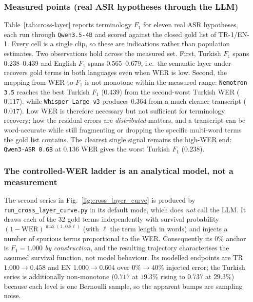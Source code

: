 \documentclass[conference]{IEEEtran}
\begin{document}
\subsubsection{Measured points (real ASR hypotheses through the LLM)}
Table~\ref{tab:cross-layer} reports terminology $F_1$ for eleven real ASR hypotheses, each run through \texttt{Qwen3.5-4B} and scored against the closed gold list of TR-1/EN-1. Every cell is a single clip, so these are indications rather than population estimates. Two observations hold across the measured set. First, Turkish $F_1$ spans $0.238$--$0.439$ and English $F_1$ spans $0.565$--$0.679$, i.e.\ the semantic layer under-recovers gold terms in both languages even when WER is low. Second, the mapping from WER to $F_1$ is not monotone within the measured range: \texttt{Nemotron 3.5} reaches the best Turkish $F_1$ ($0.439$) from the second-worst Turkish WER ($0.117$), while \texttt{Whisper Large-v3} produces $0.364$ from a much cleaner transcript ($0.017$). Low WER is therefore necessary but not sufficient for terminology recovery; how the residual errors are \emph{distributed} matters, and a transcript can be word-accurate while still fragmenting or dropping the specific multi-word terms the gold list contains. The clearest single signal remains the high-WER end: \texttt{Qwen3-ASR 0.6B} at $0.136$ WER gives the worst Turkish $F_1$ ($0.238$).

\subsubsection{The controlled-WER ladder is an analytical model, not a measurement}
The second series in Fig.~\ref{fig:cross_layer_curve} is produced by \texttt{run\_cross\_layer\_curve.py} in its default mode, which does \emph{not} call the LLM. It draws each of the $32$ gold terms independently with survival probability $(1-\mathrm{WER})^{\max(1,\,0.8\ell)}$ (with $\ell$ the term length in words) and injects a number of spurious terms proportional to the WER. Consequently its $0\%$ anchor is $F_1 = 1.000$ \emph{by construction}, and the resulting trajectory characterises the assumed survival function, not model behaviour. Its modelled endpoints are TR $1.000 \to 0.458$ and EN $1.000 \to 0.604$ over $0\% \to 40\%$ injected error; the Turkish series is additionally non-monotone ($0.717$ at $19.3\%$ rising to $0.737$ at $29.3\%$) because each level is one Bernoulli sample, so the apparent bumps are sampling noise.
\end{document}
